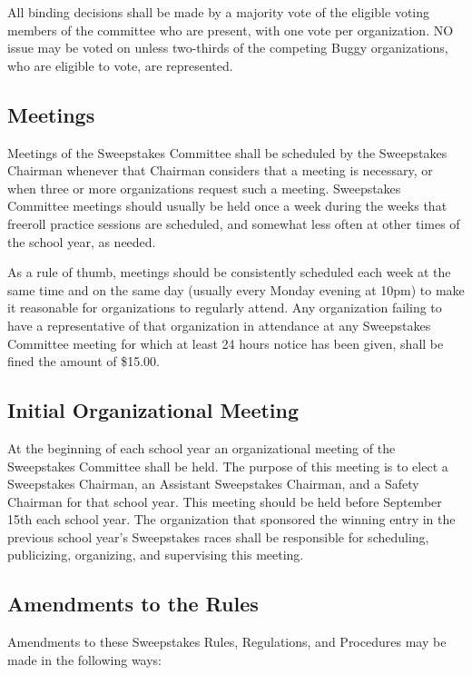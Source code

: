 	All binding decisions shall be made by a majority vote of the eligible voting
	members of the committee who are present, with one vote per organization. NO
	issue may be voted on unless two-thirds of the competing Buggy organizations,
	who are eligible to vote, are represented.

\subsection{Meetings}

	Meetings of the Sweepstakes Committee shall be scheduled by the Sweepstakes
	Chairman whenever that Chairman considers that a meeting is necessary, or when
	three or more organizations request such a meeting. Sweepstakes Committee
	meetings should usually be held once a week during the weeks that freeroll
	practice sessions are scheduled, and somewhat less often at other times of the
	school year, as needed.

	As a rule of thumb, meetings should be consistently scheduled each week at the
	same time and on the same day (usually every Monday evening at 10pm) to make it
	reasonable for organizations to regularly attend. Any organization failing to
	have a representative of that organization in attendance at any Sweepstakes
	Committee meeting for which at least 24 hours notice has been given, shall be
	fined the amount of \$15.00.

\subsection{Initial Organizational Meeting}

	At the beginning of each school year an organizational meeting of the
	Sweepstakes Committee shall be held. The purpose of this meeting is to elect a
	Sweepstakes Chairman, an Assistant Sweepstakes Chairman, and a Safety Chairman
	for that school year. This meeting should be held before September 15th each
	school year. The organization that sponsored the winning entry in the previous
	school year's Sweepstakes races shall be responsible for scheduling,
	publicizing, organizing, and supervising this meeting.

\subsection{Amendments to the Rules}

	Amendments to these Sweepstakes Rules, Regulations, and Procedures may be made
	in the following ways:

